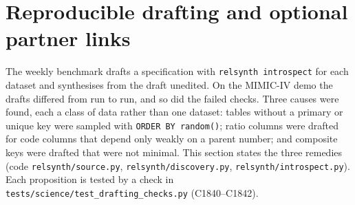 \section{Reproducible drafting and optional partner links}\label{sec:v72drafting}
\setcounter{savedpropdraft}{\value{proposition}}
The weekly benchmark drafts a specification with \texttt{relsynth introspect} for each dataset and synthesises from the draft unedited. On the MIMIC-IV demo the drafts differed from run to run, and so did the failed checks. Three causes were found, each a class of data rather than one dataset: tables without a primary or unique key were sampled with \texttt{ORDER BY random()}; ratio columns were drafted for code columns that depend only weakly on a parent number; and composite keys were drafted that were not minimal. This section states the three remedies (code \texttt{relsynth/source.py}, \texttt{relsynth/discovery.py}, \texttt{relsynth/introspect.py}). Each proposition is tested by a check in \texttt{tests/science/test\_drafting\_checks.py} (C1840--C1842).


